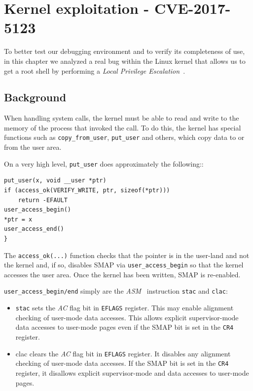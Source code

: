 \documentclass{masterthesis}
\newcommand{\vtnote}[1]{\todo[color=green!20]{#1}}
\begin{document}
\chapter{Kernel exploitation - CVE-2017-5123}
\label{ch:cve-2017}\vtnote{aggiunta frase iniziale}
To better test our debugging environment and to verify its completeness of use, in this chapter we analyzed a real bug within the Linux kernel that allows us to get a root shell by performing a \emph{Local Privilege Escalation}~\cite{farah2017study}.
\section{Background}
\label{sect:back-cve-2017}
When handling system calls, the kernel must be able to read and write to the memory of the process that invoked the call. To do this, the kernel has special functions such as \texttt{copy\_from\_user}, \texttt{put\_user} and others, which copy data to or from the user area.

On a very high level, \texttt{put\_user} does approximately the following::
\begin{lstlisting}
put_user(x, void __user *ptr)
if (access_ok(VERIFY_WRITE, ptr, sizeof(*ptr)))
    return -EFAULT
user_access_begin()
*ptr = x
user_access_end()
}
\end{lstlisting}
The \texttt{access\_ok(...)} function checks that the pointer is in the user-land and not the kernel and, if so, disables SMAP via \texttt{user\_access\_begin} so that the kernel accesses the user area. Once the kernel has been written, SMAP is re-enabled.

\texttt{user\_access\_begin/end} simply are the \textit{ASM}~\cite{salwan2014introduction} instruction \texttt{stac} and \texttt{clac}:
\begin{itemize}
\item \texttt{stac} sets the \textit{AC} flag bit in \texttt{EFLAGS} register. This may enable alignment checking of user-mode data accesses. This allows explicit supervisor-mode data accesses to user-mode pages even if the SMAP bit is set in the \texttt{CR4} register.
\item clac clears the \textit{AC} flag bit in \texttt{EFLAGS} register. It disables any alignment checking of user-mode data accesses. If the SMAP bit is set in the \texttt{CR4} register, it disallows explicit supervisor-mode and data accesses to user-mode pages.
\end{itemize}
\end{document}
